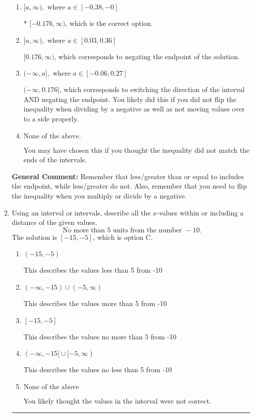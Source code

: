 \documentclass{extbook}[14pt]
\newcommand{\litem}[1]{\item #1

\rule{\textwidth}{0.4pt}}
\begin{document}
\begin{enumerate}
{\begin{enumerate}[label=\Alph*.]
 $(-\infty, -0.176]$, which corresponds to switching the direction of the interval. You likely did this if you did not flip the inequality when dividing by a negative!
\item \( [a, \infty), \text{ where } a \in [-0.38, -0] \)

* $[-0.176, \infty)$, which is the correct option.
\item \( [a, \infty), \text{ where } a \in [0.03, 0.36] \)

 $[0.176, \infty)$, which corresponds to negating the endpoint of the solution.
\item \( (-\infty, a], \text{ where } a \in [-0.06, 0.27] \)

 $(-\infty, 0.176]$, which corresponds to switching the direction of the interval AND negating the endpoint. You likely did this if you did not flip the inequality when dividing by a negative as well as not moving values over to a side properly.
\item \( \text{None of the above}. \)

You may have chosen this if you thought the inequality did not match the ends of the intervals.
\end{enumerate}

\textbf{General Comment:} Remember that less/greater than or equal to includes the endpoint, while less/greater do not. Also, remember that you need to flip the inequality when you multiply or divide by a negative.
}
\litem{
Using an interval or intervals, describe all the $x$-values within or including a distance of the given values.
\[ \text{ No more than } 5 \text{ units from the number } -10. \]The solution is \( [-15, -5] \), which is option C.\begin{enumerate}[label=\Alph*.]
\item \( (-15, -5) \)

This describes the values less than 5 from -10
\item \( (-\infty, -15) \cup (-5, \infty) \)

This describes the values more than 5 from -10
\item \( [-15, -5] \)

This describes the values no more than 5 from -10
\item \( (-\infty, -15] \cup [-5, \infty) \)

This describes the values no less than 5 from -10
\item \( \text{None of the above} \)

You likely thought the values in the interval were not correct.
\end{enumerate}

}
\end{enumerate}
\end{document}
